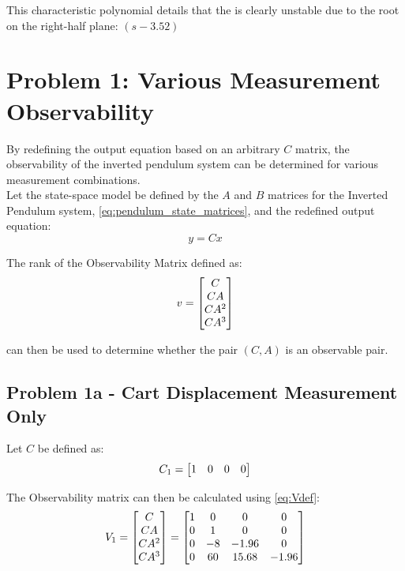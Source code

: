 \documentclass[]{article}
\begin{document}
			This characteristic polynomial details that the is clearly unstable due to the root on the right-half plane: $(s-3.52)$

\newpage
\section{Problem 1: Various Measurement Observability}
	By redefining the output equation based on an arbitrary $C$ matrix, the observability of the inverted pendulum system can be determined for various measurement combinations.\\
	
	Let the state-space model be defined by the $A$ and $B$ matrices for the Inverted Pendulum system, \eqref{eq:pendulum_state_matrices}, and the redefined output equation:
	\begin{equation}
		y = C x \label{eq:generalOutputdef}
	\end{equation}
	
	The rank of the Observability Matrix defined as:
	\begin{equation}
		v = \mqty[C\\ CA\\ CA^2\\ CA^3] \label{eq:Vdef}
	\end{equation}
	
	can then be used to determine whether the pair $(C, A)$ is an observable pair.
	
	\subsection{Problem 1a - Cart Displacement Measurement Only}
		
		Let $C$ be defined as:
		\begin{equation}
			C_1 = \mqty[1	&0	&0	&0]
		\end{equation}
	
		The Observability matrix can then be calculated using \eqref{eq:Vdef}:
		\begin{equation}
			V_1 = \mqty[C\\ CA\\ CA^2\\ CA^3]
				= \mqty[1	&0	&0		&0\\
						0	&1	&0		&0\\
						0	&-8	&-1.96	&0\\
						0	&60	&15.68	&-1.96] \label{eq:v1def}
		\end{equation}
	
\end{document}
